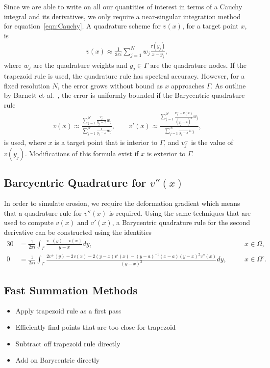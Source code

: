 \documentclass[preprint, 10pt]{elsarticle}
\begin{document}
Since we are able to write on all our quantities of interest in terms of
a Cauchy integral and its derivatives, we only require a near-singular
integration method for equation~\eqref{eqn:Cauchy}.  A quadrature scheme
for $v(x)$, for a target point $x$, is
\begin{align}
  v(x) \approx \frac{1}{2\pi i} \sum_{j=1}^N 
    w_j \frac{\tau(y_j)}{x - y_j},
\end{align}
where $w_j$ are the quadrature weights and $y_j \in \Gamma$ are the
quadrature nodes.  If the trapezoid rule is used, the quadrature rule
has spectral accuracy.  However, for a fixed resolution $N$, the error
grows without bound as $x$ approaches $\Gamma$.  As outline by Barnett
et al.~\cite{bar-wu-vee2015}, the error is uniformly bounded if the
Barycentric quadrature rule
\begin{align}
  v(x) \approx \frac{\sum_{j=1}^N \frac{v_j^-}{y_j-x}w_j}
    {\sum_{j=1}^N \frac{1}{y_j-x}w_j},  \qquad
  v'(x) \approx \frac{\sum_{j=1}^N \frac{v_j^- - v(x)}{(y_j - x)^2}w_j}
    {\sum_{j=1}^N \frac{1}{y_j-x}w_j}, 
\end{align}
is used, where $x$ is a target point that is interior to $\Gamma$,
and $v_j^-$ is the value of $v(y_j)$.  Modifications of this formula
exist if $x$ is exterior to $\Gamma$.

\subsection{Barcyentric Quadrature for $v''(x)$}
In order to simulate erosion, we require the deformation gradient which
means that a quadrature rule for $v''(x)$ is required.  Using the same
techniques that are used to compute $v(x)$ and $v'(x)$, a Barycentric
quadrature rule for the second derivative can be constructed using the
identities
\begin{alignat}{3}
  0 &= \frac{1}{2\pi i}\int_{\Gamma} 
    \frac{v^-(y)-v(x)}{y-x} dy, &&x \in \Omega, \\
  0 &= \frac{1}{2\pi i}\int_{\Gamma}
    \frac{2v^+(y)-2v(x)-2(y-x)v'(x)-(y-a)^{-1}(x-a)(y-x)^2 v''(x)}
    {(y-x)^3} dy, \quad &&x \in \Omega^c.
\end{alignat}



\subsection{Fast Summation Methods}
\label{sec:fmm}
\begin{itemize}
  \item Apply trapezoid rule as a first pass
  \item Efficiently find points that are too close for trapezoid
  \item Subtract off trapezoid rule directly
  \item Add on Barycentric directly
\end{itemize}
\end{document}
